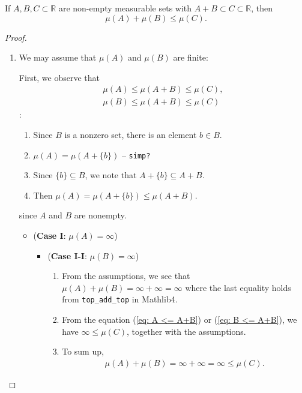 \begin{theorem}
    \label{thm:one-dim}
    If \(A, B, C \subset \mathbb{R}\) are non-empty measurable sets with \(A+B\subset C \subset \mathbb{R}\), then
    \begin{equation*}
        \mu(A) + \mu(B) \leq \mu(C).
    \end{equation*}
\end{theorem}

\begin{proof}
    \begin{enumerate}
        \item We may assume that \(\mu(A)\) and \(\mu(B)\) are finite:

        First, we observe that
        \begin{eqnarray}
            {\mu(A) \leq \mu(A+B)} \leq \mu(C), \label{eq: A <= A+B}\\
            {\mu(B) \leq \mu(A+B)} \leq \mu(C) \label{eq: B <= A+B}
        \end{eqnarray}
        :\begin{enumerate}
            \item Since \(B\) is a nonzero set, there is an element \(b \in B\).
            \item \(\mu(A) =\mu(A+\{b\})\) -- \texttt{simp?}
            \item Since \(\{b\} \subseteq B\), we note that \(A + \{b\} \subseteq A + B\).
            \item Then \(\mu(A) = \mu(A + \{b\}) \leq \mu(A+B)\).
        \end{enumerate}
        since \(A\) and \(B\) are nonempty.
        \begin{itemize}
            \item (\textbf{Case I}: \(\mu(A)=\infty\))
            \begin{itemize}
                \item (\textbf{Case I-I}: \(\mu(B) = \infty\))
                \begin{enumerate}
                    \item From the assumptions, we see that \(\mu(A) + \mu(B) = {\infty + \infty = \infty}\) where the last equality holds from \texttt{top\_add\_top} in Mathlib4.
                    \item From the equation (\ref{eq: A <= A+B}) or (\ref{eq: B <= A+B}), we have \(\infty \leq \mu(C)\), together with the assumptions.
                    \item To sum up,
                    \begin{eqnarray*}
                        \mu(A) + \mu (B) = \infty + \infty = \infty \leq \mu(C).
                    \end{eqnarray*}
                \end{enumerate}


\end{itemize}
\end{itemize}
\end{enumerate}
\end{proof}
